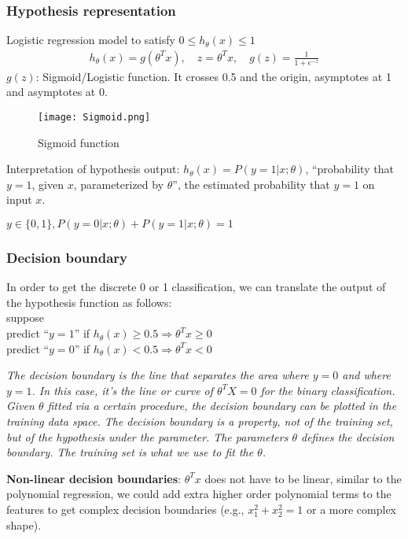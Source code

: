 \subsubsection{Hypothesis representation}
Logistic regression model to satisfy $0 \leq h_\theta(x) \leq 1$\\
\begin{align} 
h_\theta(x) = g(\theta^Tx), \quad z = \theta^Tx, \quad  g(z) = \frac{1}{1+e^{-z}}
\end{align}
$g(z)$: Sigmoid/Logistic function. It crosses 0.5 and the origin, asymptotes at 1 and asymptotes at 0.
\begin{figure}[h]
\centering
\texttt{[image: Sigmoid.png]}
\caption{Sigmoid function}
\label{fig:Sigmoid}
\end{figure}

Interpretation of hypothesis output: $h_\theta(x) = P(y=1|x;\theta)$, ``probability that $y=1$, given $x$, parameterized by $\theta$'', the estimated probability that $y = 1$ on input $x$.

$y \in \{0, 1\}, P(y=0|x;\theta) + P(y=1|x;\theta)=1$

\subsubsection{Decision boundary}

In order to get the discrete 0 or 1 classification, we can translate the output of the hypothesis function as follows:\\
suppose \\ 
predict ``$y=1$'' if $h_\theta(x) \geq 0.5 \Rightarrow \theta^Tx \geq 0$\\
predict ``$y=0$'' if $h_\theta(x) < 0.5 \Rightarrow  \theta^Tx < 0$

\emph{\textcolor{Bittersweet}{The decision boundary is the line that separates the area where $y = 0$ and where $y = 1$. In this case, it's the line or curve of $\theta^TX = 0$  for the binary classification.
Given $\theta$ fitted via a certain procedure, the decision boundary can be plotted in the training data space. The decision boundary is a property, not of the training set, but of the hypothesis under the parameter. The parameters $\theta$ defines the decision boundary. The training set is what we use to fit the $\theta$.}}

\textbf{Non-linear decision boundaries}: $\theta^Tx$ does not have to be linear, similar to the polynomial regression, we could add extra higher order polynomial terms to the features to get complex decision boundaries (e.g., $x_1^2+x_2^2=1$ or a more complex shape).

